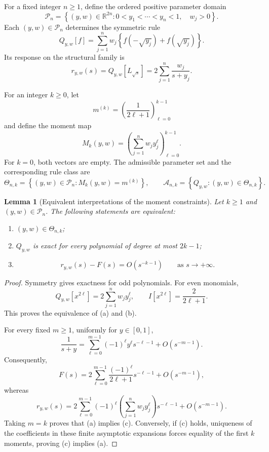 \documentclass[preprint,12pt]{elsarticle}
\newtheorem{lemma}[theorem]{Lemma}
\theoremstyle{remark}
\begin{document}
For a fixed integer \(n\geq1\), define the ordered positive parameter
domain
\[
\mathcal P_n
=
\left\{
(y,w)\in\mathbb R^{2n}:
0<y_1<\cdots<y_n<1,\quad w_j>0
\right\}.
\]
Each \((y,w)\in\mathcal P_n\) determines the symmetric rule
\[
Q_{y,w}[f]
=
\sum_{j=1}^{n}w_j
\left\{
f(-\sqrt{y_j})+f(\sqrt{y_j})
\right\}.
\]
Its response on the structural family is
\[
r_{y,w}(s)
=
Q_{y,w}[L_{\sqrt{s}}]
=
2\sum_{j=1}^{n}\frac{w_j}{s+y_j}.
\]

For an integer \(k\geq0\), let
\[
m^{(k)}
=
\left(\frac{1}{2\ell+1}\right)_{\ell=0}^{k-1}
\]
and define the moment map
\[
M_k(y,w)
=
\left(
\sum_{j=1}^{n}w_jy_j^\ell
\right)_{\ell=0}^{k-1}.
\]
For \(k=0\), both vectors are empty. The admissible parameter set and
the corresponding rule class are
\[
\Theta_{n,k}
=
\left\{
(y,w)\in\mathcal P_n:
M_k(y,w)=m^{(k)}
\right\},
\qquad
\mathcal A_{n,k}
=
\left\{
Q_{y,w}:(y,w)\in\Theta_{n,k}
\right\}.
\]

\begin{lemma}[Equivalent interpretations of the moment constraints]
Let \(k\geq1\) and \((y,w)\in\mathcal P_n\). The following statements
are equivalent:
\begin{enumerate}[label=(\alph*)]
\item \((y,w)\in\Theta_{n,k}\);
\item \(Q_{y,w}\) is exact for every polynomial of degree at most
\(2k-1\);
\item
\[
r_{y,w}(s)-F(s)=O(s^{-k-1})
\qquad
\text{as }s\to+\infty.
\]
\end{enumerate}
\end{lemma}

\begin{proof}
Symmetry gives exactness for odd polynomials. For even monomials,
\[
Q_{y,w}[x^{2\ell}]
=
2\sum_{j=1}^{n}w_jy_j^\ell,
\qquad
I[x^{2\ell}]
=
\frac{2}{2\ell+1}.
\]
This proves the equivalence of (a) and (b).

For every fixed \(m\geq1\), uniformly for \(y\in[0,1]\),
\[
\frac{1}{s+y}
=
\sum_{\ell=0}^{m-1}
(-1)^\ell y^\ell s^{-\ell-1}
+
O(s^{-m-1}).
\]
Consequently,
\[
F(s)
=
2\sum_{\ell=0}^{m-1}
\frac{(-1)^\ell}{2\ell+1}s^{-\ell-1}
+
O(s^{-m-1}),
\]
whereas
\[
r_{y,w}(s)
=
2\sum_{\ell=0}^{m-1}
(-1)^\ell
\left(\sum_{j=1}^{n}w_jy_j^\ell\right)
s^{-\ell-1}
+
O(s^{-m-1}).
\]
Taking \(m=k\) proves that (a) implies (c). Conversely, if (c) holds,
uniqueness of the coefficients in these finite asymptotic expansions
forces equality of the first \(k\) moments, proving (c) implies (a).
\end{proof}
\end{document}
